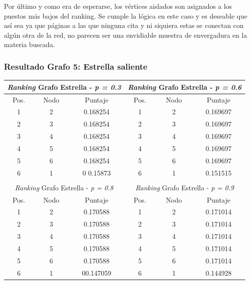 Por último y como era de esperarse, los vértices aislados son asignados a los puestos más bajos del ranking. Se cumple la lógica en este caso y es deseable que así sea ya que páginas a las que ninguna cita y ni siquiera estas se conectan con algún otra de la red, no parecen ser una envidiable muestra de envergadura en la materia buscada.\\

            
\subsubsection{Resultado Grafo 5: Estrella saliente} 

\begin{center}
         \begin{tabular}{|c|c|c||c|c|c|}
                    \hline
                    \multicolumn{3}{|c||}{\emph{Ranking} Grafo Estrella - \emph{p = 0.3}} & \multicolumn{3}{c|}{\emph{Ranking} Grafo Estrella - \emph{p = 0.6}} \\ \hline
                    Pos. & Nodo & Puntaje    & Pos. & Nodo & Puntaje  \\ \hline
1 & 2 & 0.168254 & 1 & 2 & 0.169697 \\ 
2 & 3 & 0.168254 & 2 & 3 & 0.169697 \\
3 & 4 & 0.168254  & 3 & 4 & 0.169697 \\
4 & 5 & 0.168254  & 4 & 5 & 0.169697 \\
5 &  6 & 0.168254 & 5 & 6 &  0.169697 \\
6 & 1 & 0 0.15873 & 6 & 1 &  0.151515 \\ \hline
                    \multicolumn{6}{c}{} \\ \hline
                    \multicolumn{3}{|c||}{\emph{Ranking} Grafo Estrella - \emph{p = 0.8}} & \multicolumn{3}{c|}{\emph{Ranking} Grafo Estrella - \emph{p = 0.9}} \\ \hline
                    Pos. & Nodo & Puntaje    & Pos. & Nodo & Puntaje  \\ \hline
1 & 2 & 0.170588 & 1 & 2 & 0.171014 \\ 
2 & 3 & 0.170588 & 2 & 3 & 0.171014 \\
3 & 4 & 0.170588  & 3 & 4 & 0.171014 \\
4 & 5 & 0.170588  & 4 & 5 & 0.171014 \\
5 &  6 & 0.170588 & 5 & 6 &  0.171014 \\
6 & 1 & 00.147059 & 6 & 1 &  0.144928 \\ \hline

                \end{tabular}
            \end{center}
            
